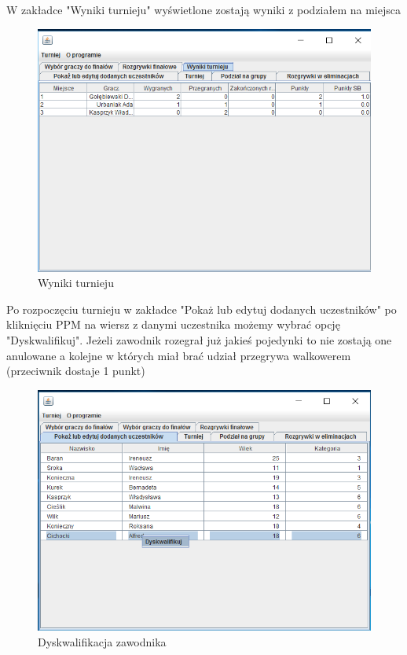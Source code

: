 W zakładce "Wyniki turnieju" wyświetlone zostają wyniki z podziałem na miejsca
\begin{figure}[H]
	\centering
	\includegraphics[width=15cm]{fig/17}
	\caption{Wyniki turnieju}
	\label {fig:wyniki_turnieju} 
\end{figure}
Po rozpoczęciu turnieju w zakładce "Pokaż lub edytuj dodanych uczestników" po kliknięciu PPM na wiersz z danymi uczestnika możemy wybrać opcję "Dyskwalifikuj". Jeżeli zawodnik rozegrał już jakieś pojedynki to nie zostają one anulowane a kolejne w których miał brać udział przegrywa walkowerem (przeciwnik dostaje 1 punkt)
\begin{figure}[H]
	\centering
	\includegraphics[width=15cm]{fig/18}
	\caption{Dyskwalifikacja zawodnika}
	\label {fig:dyskwalifikacja} 
\end{figure}